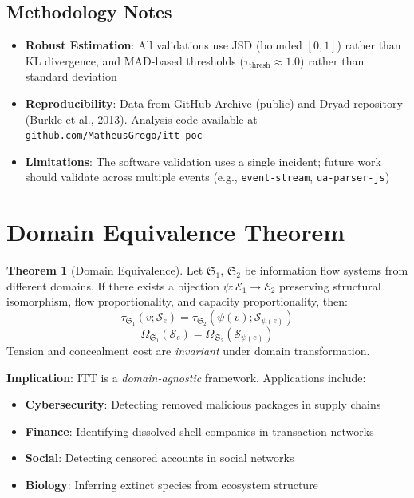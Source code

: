 \documentclass[11pt,a4paper]{article}
\theoremstyle{definition}
\newtheorem{theorem}{Theorem}[section]
\theoremstyle{remark}
\begin{document}
\subsection{Methodology Notes}

\begin{itemize}
    \item \textbf{Robust Estimation}: All validations use JSD (bounded $[0, 1]$) rather than KL divergence, and MAD-based thresholds ($\tau_{\text{thresh}} \approx 1.0$) rather than standard deviation
    
    \item \textbf{Reproducibility}: Data from GitHub Archive (public) and Dryad repository (Burkle et al., 2013). Analysis code available at \texttt{github.com/MatheusGrego/itt-poc}
    
    \item \textbf{Limitations}: The software validation uses a single incident; future work should validate across multiple events (e.g., \texttt{event-stream}, \texttt{ua-parser-js})
\end{itemize}

\section{Domain Equivalence Theorem}

\begin{theorem}[Domain Equivalence]
\label{thm:domain-equiv}
Let $\mathfrak{S}_1$, $\mathfrak{S}_2$ be information flow systems from different domains. If there exists a bijection $\psi: \mathcal{E}_1 \to \mathcal{E}_2$ preserving structural isomorphism, flow proportionality, and capacity proportionality, then:
\begin{equation}
    \tau_{\mathfrak{S}_1}(v; \mathcal{S}_e) = \tau_{\mathfrak{S}_2}(\psi(v); \mathcal{S}_{\psi(e)})
\end{equation}
\begin{equation}
    \Omega_{\mathfrak{S}_1}(\mathcal{S}_e) = \Omega_{\mathfrak{S}_2}(\mathcal{S}_{\psi(e)})
\end{equation}
Tension and concealment cost are \emph{invariant} under domain transformation.
\end{theorem}

\textbf{Implication}: ITT is a \emph{domain-agnostic} framework. Applications include:
\begin{itemize}[noitemsep]
    \item \textbf{Cybersecurity}: Detecting removed malicious packages in supply chains
    \item \textbf{Finance}: Identifying dissolved shell companies in transaction networks
    \item \textbf{Social}: Detecting censored accounts in social networks
    \item \textbf{Biology}: Inferring extinct species from ecosystem structure
\end{itemize}
\end{document}
